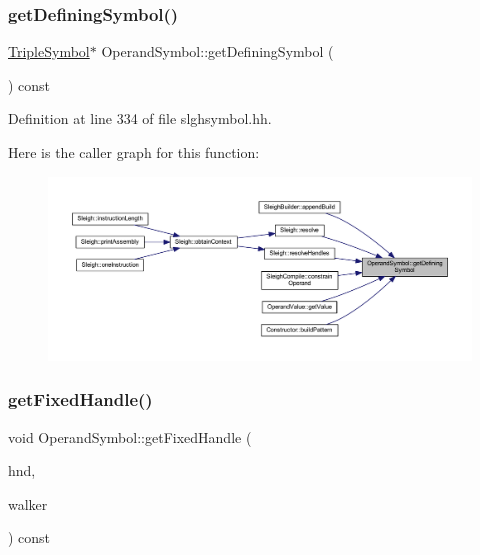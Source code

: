 \subsubsection{\texorpdfstring{getDefiningSymbol()}{getDefiningSymbol()}}
{\footnotesize\ttfamily \mbox{\hyperlink{class_triple_symbol}{Triple\+Symbol}}$\ast$ Operand\+Symbol\+::get\+Defining\+Symbol (\begin{DoxyParamCaption}\item[{void}]{ }\end{DoxyParamCaption}) const\hspace{0.3cm}{\ttfamily [inline]}}



Definition at line 334 of file slghsymbol.\+hh.

Here is the caller graph for this function\+:
\nopagebreak
\begin{figure}[H]
\begin{center}
\leavevmode
\includegraphics[width=350pt]{class_operand_symbol_ac13b93b87472c1980d6cad5be122997a_icgraph}
\end{center}
\end{figure}
\mbox{\label{class_operand_symbol_a292e9cb914a17155467e7e1f0572021c}} 
\subsubsection{\texorpdfstring{getFixedHandle()}{getFixedHandle()}}
{\footnotesize\ttfamily void Operand\+Symbol\+::get\+Fixed\+Handle (\begin{DoxyParamCaption}\item[{\mbox{\hyperlink{struct_fixed_handle}{Fixed\+Handle}} \&}]{hnd,  }\item[{\mbox{\hyperlink{class_parser_walker}{Parser\+Walker}} \&}]{walker }\end{DoxyParamCaption}) const\hspace{0.3cm}{\ttfamily [virtual]}}



